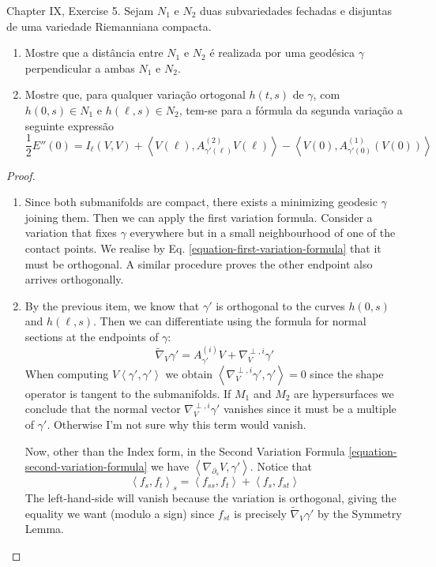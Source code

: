 \begin{exercise}
\label{exercise-two-submanifolds}
\cite{doc} Chapter IX, Exercise 5. Sejam $N_1$ e $N_2$ duas subvariedades
 fechadas e disjuntas de uma variedade Riemanniana compacta.
\begin{enumerate}
\item Mostre que a distância entre $N_1$ e $N_2$ é realizada por uma geodésica
	$\gamma$ perpendicular a ambas $N_1$ e $N_2$.
\item Mostre que, para qualquer variação ortogonal $h(t,s)$ de $\gamma$, com
$h(0,s) \in N_1$ e $h(\ell,s) \in N_2$, tem-se para a fórmula da segunda
variação a seguinte expressão
$$
\frac{1}{2}E''(0)=I_{\ell}(V,V)+
\left<V(\ell),A_{\gamma'(\ell)}^{(2)}V(\ell)\right>
-\left<V(0),A^{(1)}_{\gamma'(0)}(V(0))\right>
$$
\end{enumerate}
\end{exercise}

\begin{proof}
\begin{enumerate}
\item Since both submanifolds are compact, there exists a minimizing geodesic
$\gamma$ joining them. Then we can apply the first variation formula. Consider a
variation that fixes $\gamma$ everywhere but in a small neighbourhood of one of
the contact points. We realise by Eq. \ref{equation-first-variation-formula}
that it must be orthogonal. A similar procedure proves the other endpoint also
arrives orthogonally.

\item By the previous item, we
know that $\gamma'$ is orthogonal to the curves $h(0,s)$ and $h(\ell,s)$. Then
we can differentiate using the formula for normal sections at the endpoints of
$\gamma$:
$$
\tilde{\nabla}_{V}\gamma'=A^{(i)}_{\gamma'}V+\nabla^{\perp,i}_V\gamma'
$$
When computing $V\left<\gamma',\gamma'\right>$ we obtain
$\left<\nabla^{\perp,i}_V\gamma',\gamma'\right>=0$ since the shape operator is
tangent to the submanifolds. If $M_1$ and $M_2$ are hypersurfaces we conclude 
that the normal vector $\nabla^{\perp,i}_V\gamma'$ vanishes since it must be a 
multiple of $\gamma'$. Otherwise I'm not sure why this term would vanish.

Now, other than the Index form, in the Second Variation Formula
\ref{equation-second-variation-formula} we have
$\left<\nabla_{\partial_s}V,\gamma'\right>$. Notice that
$$
\left<f_s,f_t\right>_s=\left<f_{ss},f_t\right>+\left<f_s,f_{st}\right>
$$
The left-hand-side will vanish because the variation is orthogonal, giving the
equality we want (modulo a sign) since $f_{st}$ is precisely
$\tilde{\nabla}_V\gamma'$ by the Symmetry Lemma.
\end{enumerate}
\end{proof}

